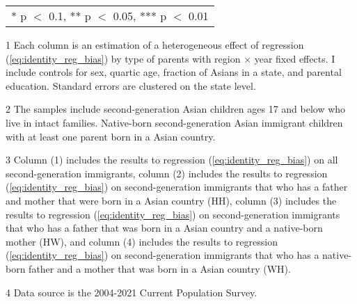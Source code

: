 \begin{table}[H]
{\begin{threeparttable}
\begin{tabular}[t]{lcccc}
\multicolumn{5}{l}{\rule{0pt}{1em}* p $<$ 0.1, ** p $<$ 0.05, *** p $<$ 0.01}\\
\end{tabular}
\begin{tablenotes}
\small
\item[1] \footnotesize{Each column is an estimation of a heterogeneous effect of regression (\ref{eq:identity_reg_bias}) by 
                      type of parents with region × year fixed effects. 
                      I include controls for sex, quartic age, fraction of Asians in a state, and parental education.
                      Standard errors are clustered on the state level.}
\item[2] \footnotesize{The samples include second-generation Asian children ages 17 and below who live in intact families. 
                      Native-born second-generation Asian 
                      immigrant children with at least one parent born in a Asian 
                      country.}
\item[3] \footnotesize{Column (1) includes the results to regression (\ref{eq:identity_reg_bias}) on all second-generation immigrants, 
                                        column (2) includes the results to regression (\ref{eq:identity_reg_bias}) on second-generation immigrants that who has a father and mother that were born in a Asian country (HH),
                                        column (3) includes the results to regression (\ref{eq:identity_reg_bias}) on second-generation immigrants that who has a father that was born in a Asian country and a native-born mother (HW), and
                                        column (4) includes the results to regression (\ref{eq:identity_reg_bias}) on second-generation immigrants that who has a native-born father and a mother that was born in a Asian country (WH).}
\item[4] \footnotesize{Data source is the 2004-2021 Current Population Survey.}
\end{tablenotes}
\end{threeparttable}}
\end{table}
